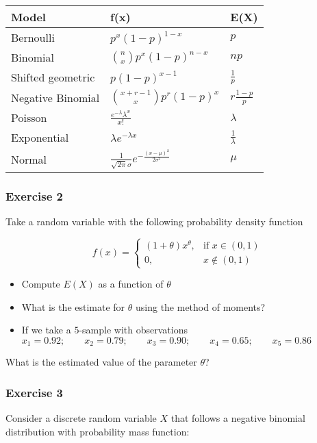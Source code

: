 \documentclass[
]{book}
\providecommand{\tightlist}{%
  \setlength{\itemsep}{0pt}\setlength{\parskip}{0pt}}
\begin{document}
\begin{longtable}[]{@{}lll@{}}
\toprule
Model & f(x) & E(X) \\
\midrule
\endhead
Bernoulli & \(p^x(1-p)^{1-x}\) & \(p\) \\
Binomial & \(\binom n x p^x(1-p)^{n-x}\) & \(np\) \\
Shifted geometric & \(p(1-p)^{x-1}\) & \(\frac{1}{p}\) \\
Negative Binomial & \(\binom {x+r-1} x p^r(1-p)^x\) & \(r\frac{1-p}{p}\) \\
Poisson & \(\frac{e^{-\lambda}\lambda^x}{x!}\) & \(\lambda\) \\
Exponential & \(\lambda e^{-\lambda x}\) & \(\frac{1}{\lambda}\) \\
Normal & \(\frac{1}{\sqrt{2\pi}\sigma}e^{-\frac{(x-\mu)^2}{2\sigma^2}}\) & \(\mu\) \\
\bottomrule
\end{longtable}

\hypertarget{exercise-2-8}{%
\subsubsection{Exercise 2}\label{exercise-2-8}}

Take a random variable with the following probability density function

\[
f(x)=
\begin{cases}
    (1+\theta)x^\theta,& \text{if } x\in (0,1)\\
    0,& x\notin (0,1)
\end{cases}
\]

\begin{itemize}
\tightlist
\item
  Compute \(E(X)\) as a function of \(\theta\)
\item
  What is the estimate for \(\theta\) using the method of moments?
\item
  If we take a \(5\)-sample with observations
  \(x_1 = 0.92; \qquad x_2 = 0.79; \qquad x_3 = 0.90; \qquad x_4 = 0.65; \qquad x_5 = 0.86\)
\end{itemize}

What is the estimated value of the parameter \(\theta\)?

\hypertarget{exercise-3-5}{%
\subsubsection{Exercise 3}\label{exercise-3-5}}

Consider a discrete random variable \(X\) that follows a negative binomial distribution with probability mass function:
\end{document}
